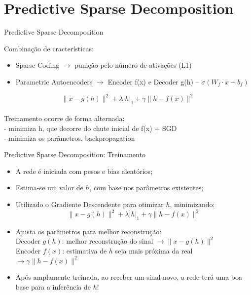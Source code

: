 \documentclass[aspectratio=169,xcolor=dvipsnames]{beamer}
\begin{document}
\section{Predictive Sparse Decomposition}

\begin{frame}{Predictive Sparse Decomposition}
    \begin{block}{Combinação de cracterísticas:}
        \begin{itemize}
            \item Sparse Coding $\rightarrow$ punição pelo número de ativações (L1)
            \item Parametric Autoencoders $\rightarrow$ Encoder f(x) e Decoder g(h) -- $\sigma(W_f \cdot x + b_f)$
        \end{itemize}
    \end{block}
    \[ \| x - g(h) \|^2 + \lambda |h|_1 + \gamma \| h - f(x) \|^2 \]
    \vspace{}
    \\Treinamento ocorre de forma alternada:
    \\- minimiza h, que decorre do chute inicial de f(x) + SGD
    \\- minimiza os parâmetros, backpropagation
    
\end{frame}

\begin{frame}{Predictive Sparse Decomposition: Treinamento \cite{kavukcuoglu2008}}
    \begin{itemize}
        \item A rede é iniciada com pesos e bias aleatórios;
        \item Estima-se um valor de $h$, com base nos parâmetros existentes;
        \item Utilizado o Gradiente Descendente para otimizar $h$, minimizando: 
        \[ \| x - g(h) \|^2 + \lambda |h|_1 + \gamma \| h - f(x) \|^2 \]
        \item Ajusta os parâmetros para melhor reconstrução:
        \\Decoder $g(h)$: melhor reconstrução do sinal $\rightarrow \| x - g(h) \|^2$
        \\Encoder $f(x)$: estimativa de $h$ seja mais próxima da real $\rightarrow \gamma \| h - f(x) \|^2$
        \item Após amplamente treinada, ao receber um sinal novo, a rede terá uma boa base para a inferência de $h$!
    \end{itemize}
\end{frame}
\end{document}
